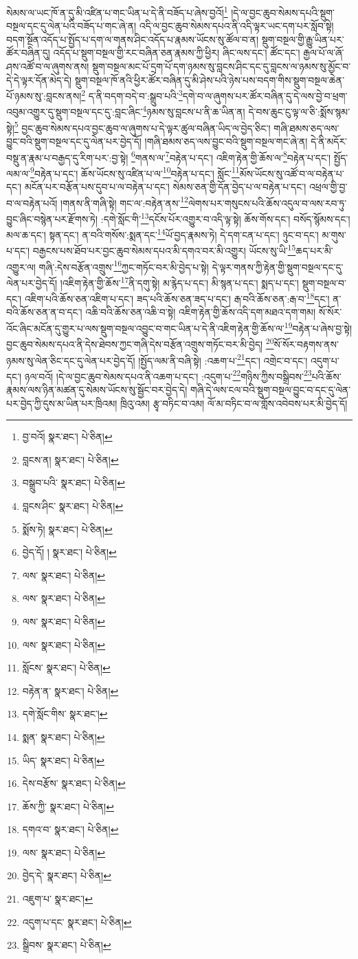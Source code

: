 སེམས་ལ་ཡང་ཁོ་ན་དུ་མི་འཛིན་པ་གང་ཡིན་པ་དེ་ནི་བཟོད་པ་ཞེས་བྱའོ།\footnote{བྱ་བའོ།  སྣར་ཐང་།  པེ་ཅིན། } །དེ་ལ་བྱང་ཆུབ་སེམས་དཔའི་སྡུག་བསྔལ་དང་དུ་ལེན་པའི་བཟོད་པ་གང་ཞེ་ན། འདི་ལ་བྱང་ཆུབ་སེམས་དཔའ་ནི་འདི་ལྟར་ཡང་དག་པར་སློབ་སྟེ། བདག་སྔོན་འདོད་པ་སྤྱོད་པ་དག་ལ་གནས་ཤིང་འདོད་པ་རྣམས་ཡོངས་སུ་ཚོལ་བ་ན། སྡུག་བསྔལ་གྱི་རྒྱུ་ཡིན་པར་ཚོར་བཞིན་དུ། འདོད་པ་སྡུག་བསྔལ་གྱི་རང་བཞིན་ཅན་རྣམས་ཀྱི་ཕྱིར། ཞིང་ལས་དང་། ཚོང་དང་། རྒྱལ་པོ་ལ་ཞོ་ཤས་འཚོ་བ་ལ་ཞུགས་ནས། སྡུག་བསྔལ་མང་པོ་དྲག་པོ་དག་ཉམས་སུ་བླངས་ཤིང་དང་དུ་བླངས་ལ་ཉམས་སུ་མྱོང་བ་དེ་དེ་ལྟར་དོན་མེད་དེ། སྡུག་བསྔལ་ཁོ་ནའི་ཕྱིར་ཚོར་བཞིན་དུ་མི་ཤེས་པའི་ཉེས་པས་བདག་གིས་སྡུག་བསྔལ་ཆེན་པོ་ཉམས་སུ་:བླངས་ནས།\footnote{བླངས་ན།  སྣར་ཐང་།  པེ་ཅིན། } ད་ནི་བདག་བདེ་བ་:སྒྲུབ་པའི་\footnote{བསྒྲུབ་པའི་  སྣར་ཐང་།  པེ་ཅིན། }དགེ་བ་ལ་ཞུགས་པར་ཚོར་བཞིན་དུ་དེ་ལས་བྱེ་བ་ཕྲག་འབུམ་འགྱུར་དུ་སྡུག་བསྔལ་དང་དུ་:བླང་ཞིང་\footnote{བླངས་ཤིང་  སྣར་ཐང་།  པེ་ཅིན། }ཉམས་སུ་བླངས་པ་ནི་ཆ་ཡིན་ན། དེ་བས་ཆུང་ངུ་ལྟ་ལ་ཅི་:སྨོས་སྙམ་སྟེ།\footnote{སྨོས་ཏེ།  སྣར་ཐང་།  པེ་ཅིན། } བྱང་ཆུབ་སེམས་དཔའ་བྱང་ཆུབ་ལ་ཞུགས་པ་དེ་ལྟར་ཚུལ་བཞིན་ཡིད་ལ་བྱེད་ཅིང་། གཞི་ཐམས་ཅད་ལས་བྱུང་བའི་སྡུག་བསྔལ་དང་དུ་ལེན་པར་བྱེད་དོ། །གཞི་ཐམས་ཅད་ལས་བྱུང་བའི་སྡུག་བསྔལ་གང་ཞེ་ན། དེ་ནི་མདོར་བསྡུ་ན་རྣམ་པ་བརྒྱད་དུ་རིག་པར་:བྱ་སྟེ། \footnote{བྱེད་དོ། །  སྣར་ཐང་།  པེ་ཅིན། }གནས་ལ་\footnote{ལས་  སྣར་ཐང་།  པེ་ཅིན། }བརྟེན་པ་དང་། འཇིག་རྟེན་གྱི་ཆོས་ལ་\footnote{ལས་  སྣར་ཐང་།  པེ་ཅིན། }བརྟེན་པ་དང་། སྤྱོད་ལམ་ལ་\footnote{ལས་  སྣར་ཐང་།  པེ་ཅིན། }བརྟེན་པ་དང་། ཆོས་ཡོངས་སུ་འཛིན་པ་ལ་\footnote{ལས་  སྣར་ཐང་།  པེ་ཅིན། }བརྟེན་པ་དང་། སློང་\footnote{སློངས་  སྣར་ཐང་།  པེ་ཅིན། }མོས་ཡོངས་སུ་འཚོ་བ་ལ་བརྟེན་པ་དང་། མངོན་པར་བརྩོན་པས་དུབ་པ་ལ་བརྟེན་པ་དང་། སེམས་ཅན་གྱི་དོན་བྱེད་པ་ལ་བརྟེན་པ་དང་། འཕྲལ་གྱི་བྱ་བ་ལ་བརྟེན་པའོ། །གནས་ནི་གཞི་སྟེ། གང་ལ་:བརྟེན་ནས་\footnote{བརྟེན་ན་  སྣར་ཐང་།  པེ་ཅིན། }ལེགས་པར་གསུངས་པའི་ཆོས་འདུལ་བ་ལས་རབ་ཏུ་བྱུང་ཞིང་བསྙེན་པར་རྫོགས་ཏེ། :དགེ་སློང་གི་\footnote{དགེ་སློང་གིས་  སྣར་ཐང་། }དངོས་པོར་འགྱུར་བ་འདི་ལྟ་སྟེ། ཆོས་གོས་དང་། བསོད་སྙོམས་དང་། མལ་ཆ་དང་། སྟན་དང་། ན་བའི་གསོས་:སྨན་དང་\footnote{སྨན་  སྣར་ཐང་།  པེ་ཅིན། }ཡོ་བྱད་རྣམས་ཏེ། དེ་དག་ངན་པ་དང་། ཉུང་བ་དང་། མ་གུས་པ་དང་། བརྒྱངས་པས་ཐོབ་པར་བྱང་ཆུབ་སེམས་དཔའ་མི་དགའ་བར་མི་འགྱུར། ཡོངས་སུ་ཡི་\footnote{ཡིད་  སྣར་ཐང་།  པེ་ཅིན། }ཆད་པར་མི་འགྱུར་ལ། གཞི་:དེས་བརྩོན་འགྲུས་\footnote{དེས་བརྩོས་  སྣར་ཐང་།  པེ་ཅིན། }ཀྱང་གཏོང་བར་མི་བྱེད་པ་སྟེ། དེ་ལྟར་གནས་ཀྱི་རྟེན་གྱི་སྡུག་བསྔལ་དང་དུ་ལེན་པར་བྱེད་དོ། །འཇིག་རྟེན་གྱི་ཆོས་\footnote{ཆོས་ཀྱི་  སྣར་ཐང་།  པེ་ཅིན། }ནི་དགུ་སྟེ། མ་རྙེད་པ་དང་། མི་སྙན་པ་དང་། སྨད་པ་དང་། སྡུག་བསྔལ་བ་དང་། འཇིག་པའི་ཆོས་ཅན་འཇིག་པ་དང་། ཟད་པའི་ཆོས་ཅན་ཟད་པ་དང་། རྒ་བའི་ཆོས་ཅན་:རྒ་བ་\footnote{དགའ་བ་  སྣར་ཐང་།  པེ་ཅིན། }དང་། ན་བའི་ཆོས་ཅན་ན་བ་དང་། འཆི་བའི་ཆོས་ཅན་འཆི་བ་སྟེ། འཇིག་རྟེན་གྱི་ཆོས་འདི་དག་མཐའ་དག་གམ། སོ་སོར་འོང་ཞིང་མངོན་དུ་གྱུར་པ་ལས་སྡུག་བསྔལ་འབྱུང་བ་གང་ཡིན་པ་དེ་ནི་འཇིག་རྟེན་གྱི་ཆོས་ལ་\footnote{ལས་  སྣར་ཐང་།  པེ་ཅིན། }བརྟེན་པ་ཞེས་བྱ་སྟེ། བྱང་ཆུབ་སེམས་དཔའ་ནི་དེས་ཐེབས་ཀྱང་གཞི་དེས་བརྩོན་འགྲུས་གཏོང་བར་མི་བྱེད། \footnote{བྱེད་དེ་  སྣར་ཐང་།  པེ་ཅིན། }སོ་སོར་བརྟགས་ནས་ཉམས་སུ་ལེན་ཅིང་དང་དུ་ལེན་པར་བྱེད་དོ། །སྤྱོད་ལམ་ནི་བཞི་སྟེ། :འཆག་པ་\footnote{འཇུག་པ་  སྣར་ཐང་། }དང་། འགྲེང་བ་དང་། འདུག་པ་དང་། ཉལ་བའོ། །དེ་ལ་བྱང་ཆུབ་སེམས་དཔའ་ནི་འཆག་པ་དང་། :འདུག་པ་\footnote{འདུག་པ་དང་  སྣར་ཐང་།  པེ་ཅིན། }གཉིས་ཀྱིས་བསྒྲིབས་\footnote{སྒྲིབས་  སྣར་ཐང་།  པེ་ཅིན། }པའི་ཆོས་རྣམས་ལས་ཉིན་མཚན་དུ་སེམས་ཡོངས་སུ་སྦྱོང་བར་བྱེད་དེ། གཞི་དེ་ལས་ངལ་བའི་སྡུག་བསྔལ་བྱུང་བ་དང་དུ་ལེན་པར་བྱེད་ཀྱི་དུས་མ་ཡིན་པར་ཁྲིའམ། ཁྲིའུ་འམ། རྩྭ་བཏིང་བ་འམ། ལོ་མ་བཏིང་བ་ལ་གློས་འབེབས་པར་མི་བྱེད་དོ། 